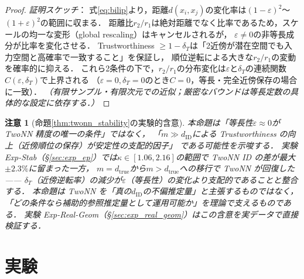 \documentclass[11pt,a4paper]{jsarticle}
\newtheorem{remark}{注意}
\newcommand{\kap}{\kappa}
\begin{document}
\begin{proof}
\textit{証明スケッチ}：
式\eqref{eq:bilip}より，距離$d(x_i, x_j)$の変化率は$(1-\varepsilon)^2$〜$(1+\varepsilon)^2$の範囲に収まる．
距離比$r_2/r_1$は絶対距離でなく比率であるため，スケールの均一な変形（global rescaling）はキャンセルされるが，
$\varepsilon \neq 0$の非等長成分が比率を変化させる．
Trustworthiness $\geq 1-\delta_T$は「2近傍が潜在空間でも入力空間と高確率で一致すること」を保証し，
順位逆転による大きな$r_2/r_1$の変動を確率的に抑える．
これら2条件の下で，$r_2/r_1$の分布変化は$\varepsilon$と$\delta_T$の連続関数$C(\varepsilon,\delta_T)$で上界される
（$\varepsilon=0, \delta_T=0$のとき$C=0$，等長・完全近傍保存の場合に一致）．
\textit{（有限サンプル・有限次元での近似；厳密なバウンドは等長定数の具体的な設定に依存する．）}
\end{proof}

\begin{remark}[命題\ref{thm:twonn_stability}の実験的含意]
本命題は「等長性$\varepsilon \approx 0$が TwoNN 精度の唯一の条件」ではなく，
「$m \gg d_\mathrm{ID}$による Trustworthiness の向上（近傍順位の保存）が安定性の支配的因子」
である可能性を示唆する．
実験 Exp-Stab（§\ref{sec:exp_ep}）では$\kap \in [1.06, 2.16]$の範囲で TwoNN ID の差が最大$\pm 2.3\%$に留まった一方，
$m = d_\mathrm{true}$から$m > d_\mathrm{true}$への移行で TwoNN が回復した——
$\delta_T$（近傍逆転率）の減少が$\varepsilon$（等長性）の変化より支配的であることと整合する．
本命題は TwoNN を「真の$d_\mathrm{ID}$の不偏推定量」と主張するものではなく，
「どの条件なら補助的参照推定量として運用可能か」を理論で支えるものである．
実験 Exp-Real-Geom（§\ref{sec:exp_real_geom}）はこの含意を実データで直接検証する．
\end{remark}

\section{実験}\label{sec:exp}
\end{document}
